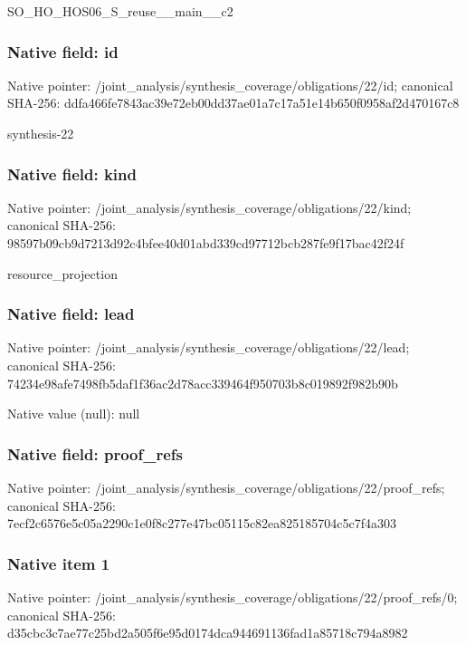 \documentclass[10pt,a4paper]{article}
\begin{document}
\begingroup\raggedright\sloppy SO\_\allowbreak{}HO\_\allowbreak{}HOS06\_\allowbreak{}S\_\allowbreak{}reuse\_\allowbreak{}\_\allowbreak{}main\_\allowbreak{}\_\allowbreak{}c2\par\endgroup

\subsubsection{Native field: id}
Native pointer: /joint\_\allowbreak{}analysis/synthesis\_\allowbreak{}coverage/obligations/22/id; canonical SHA-256: ddfa466fe7843ac39e72eb00dd37ae01a7c17a51e14b650f0958af2d470167c8

\begingroup\raggedright\sloppy synthesis-22\par\endgroup

\subsubsection{Native field: kind}
Native pointer: /joint\_\allowbreak{}analysis/synthesis\_\allowbreak{}coverage/obligations/22/kind; canonical SHA-256: 98597b09cb9d7213d92c4bfee40d01abd339cd97712bcb287fe9f17bac42f24f

\begingroup\raggedright\sloppy resource\_\allowbreak{}projection\par\endgroup

\subsubsection{Native field: lead}
Native pointer: /joint\_\allowbreak{}analysis/synthesis\_\allowbreak{}coverage/obligations/22/lead; canonical SHA-256: 74234e98afe7498fb5daf1f36ac2d78acc339464f950703b8c019892f982b90b

Native value (null): null

\subsubsection{Native field: proof\_\allowbreak{}refs}
Native pointer: /joint\_\allowbreak{}analysis/synthesis\_\allowbreak{}coverage/obligations/22/proof\_\allowbreak{}refs; canonical SHA-256: 7ecf2c6576e5c05a2290c1e0f8c277e47bc05115c82ea825185704c5c7f4a303

\subsubsection{Native item 1}
Native pointer: /joint\_\allowbreak{}analysis/synthesis\_\allowbreak{}coverage/obligations/22/proof\_\allowbreak{}refs/0; canonical SHA-256: d35cbc3c7ae77c25bd2a505f6e95d0174dca944691136fad1a85718c794a8982
\end{document}
